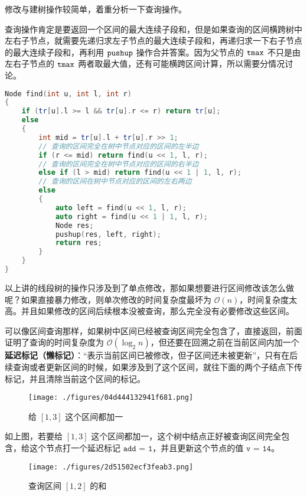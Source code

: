 修改与建树操作较简单，着重分析一下查询操作。

查询操作肯定是要返回一个区间的最大连续子段和，但是如果查询的区间横跨树中左右子节点，就需要先递归求左子节点的最大连续子段和，再递归求一下右子节点的最大连续子段和，再利用 $\tt pushup$ 操作合并答案。因为父节点的 $\tt tmax$ 不只是由左右子节点的 $\tt tmax$ 两者取最大值，还有可能横跨区间计算，所以需要分情况讨论。

\begin{lstlisting}[language=cpp]
Node find(int u, int l, int r)
{
    if (tr[u].l >= l && tr[u].r <= r) return tr[u];
    else 
    {
        int mid = tr[u].l + tr[u].r >> 1;
        // 查询的区间完全在树中节点对应的区间的左半边
        if (r <= mid) return find(u << 1, l, r);    
        // 查询的区间完全在树中节点对应的区间的右半边
        else if (l > mid) return find(u << 1 | 1, l, r);
        // 查询的区间在树中节点对应的区间的左右两边
        else 
        {
            auto left = find(u << 1, l, r);
            auto right = find(u << 1 | 1, l, r);
            Node res;
            pushup(res, left, right);
            return res;
        }
    }
}
\end{lstlisting}

以上讲的线段树的操作只涉及到了单点修改，那如果想要进行区间修改该怎么做呢？如果直接暴力修改，则单次修改的时间复杂度最坏为 $\mathcal{O}(n)$，时间复杂度太高。并且如果修改的区间后续根本没被查询，那么完全没有必要修改这些区间。

可以像区间查询那样，如果树中区间已经被查询区间完全包含了，直接返回，前面证明了查询的时间复杂度为 $\mathcal{O}(\log_2 n)$，但还要在回溯之前在当前区间内加一个\textbf{延迟标记（懒标记）}：“表示当前区间已被修改，但子区间还未被更新”，只有在后续查询或者更新区间的时候，如果涉及到了这个区间，就往下面的两个子结点下传标记，并且清除当前这个区间的标记。

\begin{figure}[ht]
\centering
\texttt{[image: ./figures/04d444132941f681.png]}
\caption{给 $[1, 3]$ 这个区间都加一} \label{fig_STree_9}
\end{figure}

如上图，若要给 $[1, 3]$ 这个区间都加一，这个树中结点正好被查询区间完全包含，给这个节点打一个延迟标记 $\texttt{add = 1}$，并且更新这个节点的值 $\texttt{v = 14}$。

\begin{figure}[ht]
\centering
\texttt{[image: ./figures/2d51502ecf3feab3.png]}
\caption{查询区间 $[1, 2]$ 的和} \label{fig_STree_10}
\end{figure}

